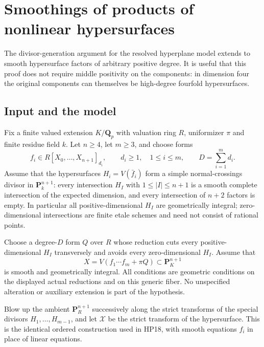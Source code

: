 \section{Smoothings of products of nonlinear hypersurfaces}
\label{r18nf:section}

The divisor-generation argument for the resolved hyperplane model
extends to smooth hypersurface factors of arbitrary positive degree.
It is useful that this proof does not require middle positivity on
the components: in dimension four the original components can
themselves be high-degree fourfold hypersurfaces.

\subsection{Input and the model}

Fix a finite valued extension $K/\mathbf Q_p$ with valuation ring
$R$, uniformizer $\pi$ and finite residue field $k$.  Let $n\ge4$,
let $m\ge3$, and choose forms
\[
 f_i\in R[X_0,\ldots,X_{n+1}]_{d_i},\qquad d_i\ge1,
 \quad 1\le i\le m,
 \qquad D=\sum_{i=1}^m d_i.
 \tag{NF18.1}\label{r18nf:factors}
\]
Assume that the hypersurfaces $H_i=V(\bar f_i)$ form a simple
normal-crossings divisor in $\mathbf P^{n+1}_k$: every intersection
$H_I$ with $1\le |I|\le n+1$ is a smooth complete intersection of
the expected dimension, and every intersection of $n+2$ factors is
empty.  In particular all positive-dimensional $H_I$ are geometrically
integral; zero-dimensional intersections are finite etale schemes
and need not consist of rational points.

Choose a degree-$D$ form $Q$ over $R$ whose reduction cuts every
positive-dimensional $H_I$ transversely and avoids every
zero-dimensional $H_I$.  Assume that
\[
              X=V(f_1\cdots f_m+\pi Q)\subset\mathbf P^{n+1}_K
 \tag{NF18.2}\label{r18nf:generic}
\]
is smooth and geometrically integral.  All conditions are geometric
conditions on the displayed actual reductions and on this generic
fiber.  No unspecified alteration or auxiliary extension is part
of the hypothesis.

Blow up the ambient $\mathbf P^{n+1}_R$ successively along the
strict transforms of the special divisors $H_1,\ldots,H_{m-1}$,
and let $\mathcal X$ be the strict transform of the hypersurface.
This is the identical ordered construction used in HP18, with
smooth equations $f_i$ in place of linear equations.

